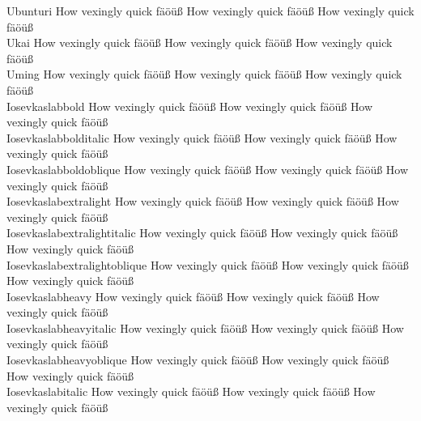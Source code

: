 \begin{tabbing}
Ubunturi \> {\mktsStyleNormal{}How vexingly quick fäöüß} {\mktsFontfileUbunturi{}How vexingly quick fäöüß} {\mktsStyleItalic{}How vexingly quick fäöüß} \\
Ukai \> {\mktsStyleNormal{}How vexingly quick fäöüß} {\mktsFontfileUkai{}How vexingly quick fäöüß} {\mktsStyleItalic{}How vexingly quick fäöüß} \\
Uming \> {\mktsStyleNormal{}How vexingly quick fäöüß} {\mktsFontfileUming{}How vexingly quick fäöüß} {\mktsStyleItalic{}How vexingly quick fäöüß} \\
Iosevkaslabbold \> {\mktsStyleNormal{}How vexingly quick fäöüß} {\mktsFontfileIosevkaslabbold{}How vexingly quick fäöüß} {\mktsStyleItalic{}How vexingly quick fäöüß} \\
Iosevkaslabbolditalic \> {\mktsStyleNormal{}How vexingly quick fäöüß} {\mktsFontfileIosevkaslabbolditalic{}How vexingly quick fäöüß} {\mktsStyleItalic{}How vexingly quick fäöüß} \\
Iosevkaslabboldoblique \> {\mktsStyleNormal{}How vexingly quick fäöüß} {\mktsFontfileIosevkaslabboldoblique{}How vexingly quick fäöüß} {\mktsStyleItalic{}How vexingly quick fäöüß} \\
Iosevkaslabextralight \> {\mktsStyleNormal{}How vexingly quick fäöüß} {\mktsFontfileIosevkaslabextralight{}How vexingly quick fäöüß} {\mktsStyleItalic{}How vexingly quick fäöüß} \\
Iosevkaslabextralightitalic \> {\mktsStyleNormal{}How vexingly quick fäöüß} {\mktsFontfileIosevkaslabextralightitalic{}How vexingly quick fäöüß} {\mktsStyleItalic{}How vexingly quick fäöüß} \\
Iosevkaslabextralightoblique \> {\mktsStyleNormal{}How vexingly quick fäöüß} {\mktsFontfileIosevkaslabextralightoblique{}How vexingly quick fäöüß} {\mktsStyleItalic{}How vexingly quick fäöüß} \\
Iosevkaslabheavy \> {\mktsStyleNormal{}How vexingly quick fäöüß} {\mktsFontfileIosevkaslabheavy{}How vexingly quick fäöüß} {\mktsStyleItalic{}How vexingly quick fäöüß} \\
Iosevkaslabheavyitalic \> {\mktsStyleNormal{}How vexingly quick fäöüß} {\mktsFontfileIosevkaslabheavyitalic{}How vexingly quick fäöüß} {\mktsStyleItalic{}How vexingly quick fäöüß} \\
Iosevkaslabheavyoblique \> {\mktsStyleNormal{}How vexingly quick fäöüß} {\mktsFontfileIosevkaslabheavyoblique{}How vexingly quick fäöüß} {\mktsStyleItalic{}How vexingly quick fäöüß} \\
Iosevkaslabitalic \> {\mktsStyleNormal{}How vexingly quick fäöüß} {\mktsFontfileIosevkaslabitalic{}How vexingly quick fäöüß} {\mktsStyleItalic{}How vexingly quick fäöüß} \\

\end{tabbing}
